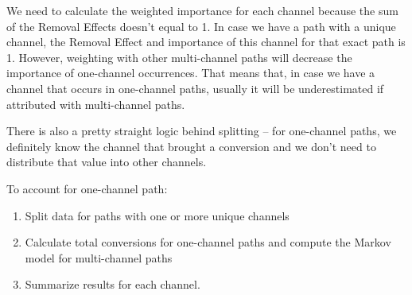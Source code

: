 \documentclass[
]{book}
\providecommand{\tightlist}{%
  \setlength{\itemsep}{0pt}\setlength{\parskip}{0pt}}
\begin{document}
We need to calculate the weighted importance for each channel because the sum of the Removal Effects doesn't equal to 1.
In case we have a path with a unique channel, the Removal Effect and importance of this channel for that exact path is
1. However, weighting with other multi-channel paths will decrease the importance of one-channel occurrences. That means
that, in case we have a channel that occurs in one-channel paths, usually it will be underestimated if attributed with
multi-channel paths.

There is also a pretty straight logic behind splitting -- for one-channel paths, we definitely know the channel that
brought a conversion and we don't need to distribute that value into other channels.

To account for one-channel path:

\begin{enumerate}
\def\labelenumi{\arabic{enumi}.}
\tightlist
\item
  Split data for paths with one or more unique channels
\item
  Calculate total conversions for one-channel paths and compute the Markov model for multi-channel paths
\item
  Summarize results for each channel.
\end{enumerate}
\end{document}
